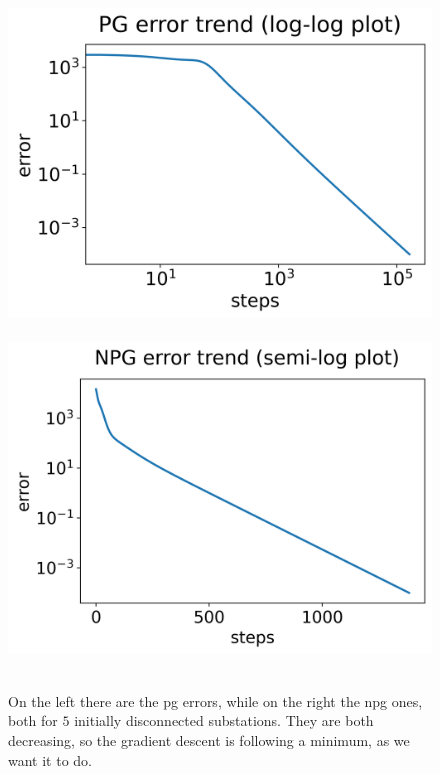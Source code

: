 \begin{figure}[t]
    \centering
    \mbox{
        \hspace*{-10pt}\includegraphics[scale=0.52]{chapters/figures/errors_log_log_PG.png}
        \hspace*{-5pt}\includegraphics[scale=0.52]{chapters/figures/errors_log_NPG.png}
    }
    \caption{On the left there are the \acrshort{pg} errors, while on the right the \acrshort{npg} ones, both for $5$ initially disconnected substations. They are both decreasing, so the gradient descent is following a minimum, as we want it to do.}
    \label{fig:errors}
\end{figure}

